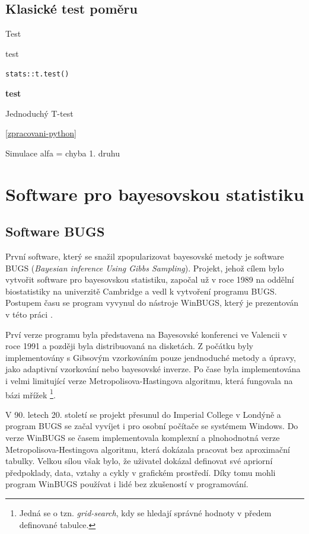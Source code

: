 \documentclass[
  11pt,
  a4paper]{report}
\begin{document}
\subsection{Klasické test poměru}\label{klasickuxe9-test-pomux11bru}

Test

test

\texttt{stats::t.test()}

\textbf{test}

Jednoduchý T-test

\ref{zpracovani-python}

Simulace alfa = chyba 1. druhu

\section{Software pro bayesovskou
statistiku}\label{software-pro-bayesovskou-statistiku}

\subsection{Software BUGS}\label{software-bugs}

První software, který se snažil zpopularizovat bayesovské metody je
software BUGS (\emph{Bayesian inference Using Gibbs Sampling}). Projekt,
jehož cílem bylo vytvořit software pro bayesovskou statistiku, započal
už v roce 1989 na oddělní biostatistiky na univerzitě Cambridge a vedl k
vytvoření programu BUGS. Postupem času se program vyvynul do nástroje
WinBUGS, který je prezentován v této práci
\parencite{TheBayesianScientificWorkingGroup2024_BayesianScientificWork}.

Prví verze programu byla představena na Bayesovské konferenci ve
Valencii v roce 1991 a později byla distribuovaná na disketách. Z
počátku byly implementovány s Gibsovým vzorkováním pouze jendnoduché
metody a úpravy, jako adaptivní vzorkování nebo bayesovské inverze. Po
čase byla implementována i velmi limitující verze
Metropolisova-Hastingova algoritmu, která fungovala na bázi mřížek
\footnote{Jedná se o tzn. \emph{grid-search}, kdy se hledají správné
  hodnoty v předem definované tabulce.}.

V 90. letech 20. století se projekt přesunul do Imperial College v
Londýně a program BUGS se začal vyvíjet i pro osobní počítače se
systémem Windows. Do verze WinBUGS se časem implementovala komplexní a
plnohodnotná verze Metropolisova-Hestingova algoritmu, která dokázala
pracovat bez aproximační tabulky. Velkou sílou však bylo, že uživatel
dokázal definovat své apriorní předpoklady, data, vztahy a cykly v
grafickém prostředí. Díky tomu mohli program WinBUGS používat i lidé bez
zkušeností v programování.
\end{document}
